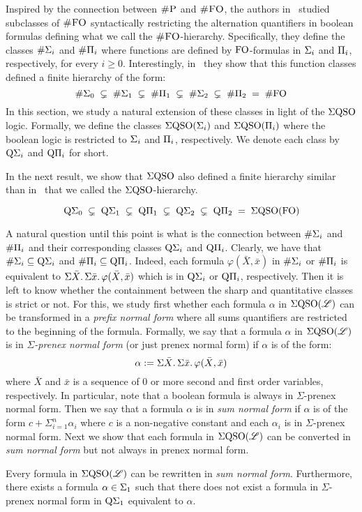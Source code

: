 
Inspired by the connection between $\text{\sc \#P}$ and $\text{\sc \#FO}$, the authors in~\cite{SalujaST95} studied subclasses of  $\text{\sc \#FO}$ syntactically restricting the alternation quantifiers in boolean formulas defining what we call the $\text{\sc \#FO}$-hierarchy.
Specifically, they define the classes $\#\Sigma_{i}$ and $\#\Pi_{i}$ where functions are defined by ${\rm FO}$-formulas in $\Sigma_{i}$ and $\Pi_{i}$, respectively, for every $i \geq 0$. 
Interestingly, in~\cite{SalujaST95} they show that this function classes defined a finite hierarchy of the form:
\[
\#\Sigma_{0} \; \subsetneq \; \#\Sigma_{1} \; \subsetneq \; \#\Pi_{1} \; \subsetneq \; \#\Sigma_{2} \; \subsetneq \; \#\Pi_{2} \; = \; \#{\rm FO} 
\]
In this section, we study a natural extension of these classes in light of the $\Sigma{\rm QSO}$ logic. Formally, we define the classes $\Sigma{\rm QSO}(\Sigma_{i})$ and $\Sigma{\rm QSO}(\Pi_{i})$ where the boolean logic is restricted to $\Sigma_{i}$ and $\Pi_{i}$, respectively. 
We denote each class by $\operatorname{Q}\!\Sigma_{i}$ and $\operatorname{Q}\!\Pi_{i}$ for short. 

In the next result, we show that $\Sigma{\rm QSO}$ also defined a finite hierarchy similar than in~\cite{SalujaST95} that we called the $\Sigma{\rm QSO}$-hierarchy.
\begin{proposition}
\[
\operatorname{Q}\!\Sigma_{0} \; \subsetneq \; \operatorname{Q}\!\Sigma_{1} \; \subsetneq \; \operatorname{Q}\!\Pi_{1} \; \subsetneq \; \operatorname{Q}\!\Sigma_{2} \; \subsetneq \; \operatorname{Q}\!\Pi_{2} \; = \; \Sigma{\rm QSO}({\rm FO})
\]
\end{proposition}
A natural question until this point is what is the connection between $\#\Sigma_{i}$ and $\#\Pi_{i}$ and their corresponding classes $\operatorname{Q}\!\Sigma_{i}$ and $\operatorname{Q}\!\Pi_{i}$. Clearly, we have that $\#\Sigma_{i} \subseteq \operatorname{Q}\!\Sigma_{i}$ and $\#\Pi_{i} \subseteq \operatorname{Q}\!\Pi_{i}$. Indeed, each formula $\varphi(\bar{X}, \bar{x})$ in $\#\Sigma_{i}$ or $\#\Pi_{i}$ is equivalent to $\Sigma{\bar X}.\, \Sigma{\bar x}.\, \varphi(\bar{X}, \bar{x})$ which is in $\operatorname{Q}\!\Sigma_{i}$ or $\operatorname{Q}\!\Pi_{i}$, respectively. 
Then it is left to know whether the containment between the sharp and quantitative classes is strict or not. 
For this, we study first whether each formula $\alpha$ in $\Sigma{\rm QSO}(\mathscr{L})$ can be transformed in a \emph{prefix normal form} where all sums quantifiers are restricted to the beginning of the formula. 
Formally, we say that a formula $\alpha$ in $\Sigma{\rm QSO}(\mathscr{L})$ is in \emph{$\Sigma$-prenex normal form} (or just prenex normal form) if $\alpha$ is of the form:
\[
\alpha := \Sigma{\bar{X}}.\, \Sigma{\bar{x}}.\, \varphi(\bar{X}, \bar{x})
\]
where $\bar{X}$ and $\bar{x}$ is a sequence of $0$ or more second and first order variables, respectively.
In particular, note that a boolean formula is always in $\Sigma$-prenex normal form.
Then we say that a formula $\alpha$ is in \emph{sum normal form} if $\alpha$ is of the form $c + \Sigma_{i=1}^n \alpha_i$ where $c$ is a non-negative constant and each $\alpha_i$ is in $\Sigma$-prenex normal form.
Next we show that each formula in $\Sigma{\rm QSO}(\mathscr{L})$ can be converted in \emph{sum normal form} but not always in prenex normal form.
\begin{theorem}
	Every formula in $\Sigma{\rm QSO}(\mathscr{L})$ can be rewritten in \emph{sum normal form}. Furthermore, there exists a formula $\alpha \in \Sigma_{1}$ such that there does not exist a formula in $\Sigma$-prenex normal form in $\operatorname{Q}\!\Sigma_{1}$ equivalent to $\alpha$.
\end{theorem}

